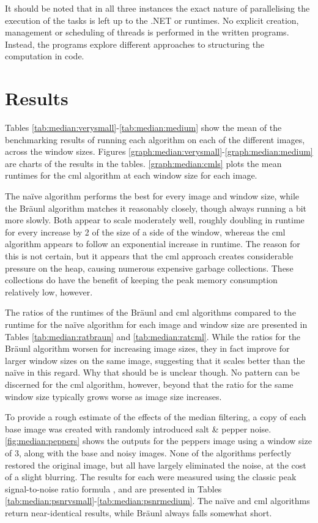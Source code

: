 It should be noted that in all three instances the exact nature of parallelising the execution of the tasks is left up to the .NET or \hopac{} runtimes.  No explicit creation, management or scheduling of threads is performed in the written programs.  Instead, the programs explore different approaches to structuring the computation in code.

\section{Results}
Tables \ref{tab:median:verysmall}-\ref{tab:median:medium} show the mean of the benchmarking results of running each algorithm on each of the different images, across the window sizes.  Figures \ref{graph:median:verysmall}-\ref{graph:median:medium} are charts of the results in the tables.  \autoref{graph:median:cmls} plots the mean runtimes for the \gls{cml} algorithm at each window size for each image. 

The na\"{i}ve algorithm performs the best for every image and window size, while the Bräunl algorithm matches it reasonably closely, though always running a bit more slowly.  Both appear to scale moderately well, roughly doubling in runtime for every increase by 2 of the size of a side of the window, whereas the \gls{cml} algorithm appears to follow an exponential increase in runtime.  The reason for this is not certain, but it appears that the \gls{cml} approach creates considerable pressure on the heap, causing numerous expensive garbage collections.  These collections do have the benefit of keeping the peak memory consumption relatively low, however.

The ratios of the runtimes of the Bräunl and \gls{cml} algorithms compared to the runtime for the naïve algorithm for each image and window size are presented in Tables \ref{tab:median:ratbraun} and \ref{tab:median:ratcml}.  While the ratios for the Bräunl algorithm worsen for increasing image sizes, they in fact improve for larger window sizes on the same image, suggesting that it scales better than the naïve in this regard.  Why that should be is unclear though.  No pattern can be discerned for the \gls{cml} algorithm, however, beyond that the ratio for the same window size typically grows worse as image size increases.

To provide a rough estimate of the effects of the median filtering, a copy of each base image was created with randomly introduced salt \& pepper noise.  \autoref{fig:median:peppers} shows the outputs for the peppers image using a window size of 3, along with the base and noisy images.  None of the algorithms perfectly restored the original image, but all have largely eliminated the noise, at the cost of a slight blurring.  The results for each were measured using the classic peak signal-to-noise ratio formula \cite{Boncelet2005}, and are presented in Tables \ref{tab:median:psnrvsmall}-\ref{tab:median:psnrmedium}.  The naïve and \gls{cml} algorithms return near-identical results, while Bräunl always falls somewhat short.

